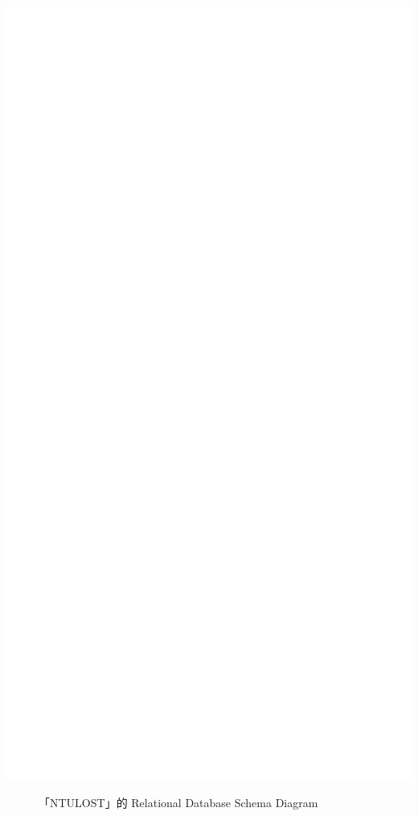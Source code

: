 \documentclass[12pt,a4paper]{article}
\begin{document}
\newpage
% 
\vspace*{-3.5cm}\includegraphics[scale=.7]{pre.pdf}
\vspace*{-3.3cm}
\begin{figure}[H]
    \caption{「NTULOST」的 Relational Database Schema Diagram}
    \label{fig:schemaDiagram}
\end{figure}
\newpage
\end{document}
